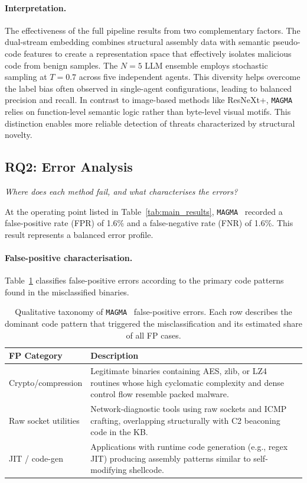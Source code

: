 \documentclass[pdflatex,sn-mathphys-num]{sn-jnl}
\newcommand{\sysname}{\texttt{MAGMA}~}
\begin{document}
\paragraph{Interpretation.}
The effectiveness of the full pipeline results from two complementary factors. The dual-stream embedding combines structural assembly data with semantic pseudo-code features to create a representation space that effectively isolates malicious code from benign samples. The $N{=}5$ LLM ensemble employs stochastic sampling at $T{=}0.7$ across five independent agents. This diversity helps overcome the label bias often observed in single-agent configurations, leading to balanced precision and recall. In contrast to image-based methods like ResNeXt+, \sysname{} relies on function-level semantic logic rather than byte-level visual motifs. This distinction enables more reliable detection of threats characterized by structural novelty.

\subsection{RQ2: Error Analysis}
\label{sec:rq2}
\textit{Where does each method fail, and what characterises the errors?}

At the operating point listed in Table~\ref{tab:main_results}, \sysname{}
recorded a false-positive rate (FPR) of 1.6\% and a false-negative rate (FNR)
of 1.6\%. This result represents a balanced error profile.

\paragraph{False-positive characterisation.}
Table~\ref{tab:fp_taxonomy} classifies false-positive errors according to the
primary code patterns found in the misclassified binaries.

\begin{table}[t]
\centering
\caption{Qualitative taxonomy of \sysname{} false-positive errors.
Each row describes the dominant code pattern that triggered the
misclassification and its estimated share of all FP cases.}
\label{tab:fp_taxonomy}
\small
\begin{tabular}{@{}lp{}@{}}
\toprule
\textbf{FP Category} & \textbf{Description} \\
\midrule
Crypto/compression & Legitimate binaries containing AES, zlib, or LZ4
    routines whose high cyclomatic complexity and dense
    control flow resemble packed malware. \\
Raw socket utilities & Network-diagnostic tools using raw sockets and
    ICMP crafting, overlapping structurally with C2
    beaconing code in the KB. \\
JIT / code-gen & Applications with runtime code generation (e.g.,
    regex JIT) producing assembly patterns similar to
    self-modifying shellcode. \\
\bottomrule
\end{tabular}
\end{table}
\end{document}
